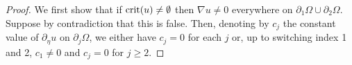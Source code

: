 \documentclass[10 pt,a4paper]{article}
\theoremstyle{definition}
\begin{document}
\begin{proof}
	
	We first show that if ${\rm crit}(u)\neq\emptyset$ then $\nabla u\neq 0$ everywhere on $\partial_1\Omega \cup \partial_2\Omega$. Suppose by contradiction that this is false. Then, denoting by $c_j$ the constant value of $\partial_\eta u$ on $\partial_j\Omega$, we either have $c_j = 0$ for each $j$ or, up to switching index 1 and 2, $c_1 \neq 0$ and $c_j = 0$ for $j \ge 2$.
	

\end{proof}
\end{document}
